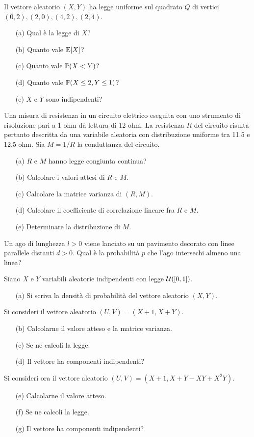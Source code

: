 \Esercizio{}
Il vettore aleatorio $(X,Y)$ ha legge uniforme sul quadrato $Q$ di vertici $(0,2),(2,0),(4,2),(2,4)$.
\begin{enumerate}
\item [(a)] Qual è la legge di $X$?
\item [(b)] Quanto vale $\mathbb{E}[X]$?
\item [(c)] Quanto vale $\mathbb{P}(X<Y)$?
\item [(d)] Quanto vale $\mathbb{P}(X\leq 2,Y\leq 1)$?
\item [(e)] $X$ e $Y$ sono indipendenti?
\end{enumerate}

\Esercizio{}
Una misura di resistenza in un circuito elettrico eseguita con uno strumento di risoluzione pari a 1 ohm dà lettura di 12 ohm. La resistenza $R$ del circuito risulta pertanto descritta da una variabile aleatoria con distribuzione uniforme tra 11.5 e 12.5 ohm. Sia $M=1/R$ la conduttanza del circuito. 
\begin{enumerate}
\item [(a)] $R$ e $M$ hanno legge congiunta continua?
\item [(b)] Calcolare i valori attesi di $R$ e $M$.
\item [(c)] Calcolare la matrice varianza di $(R,M)$.
\item [(d)] Calcolare il coefficiente di correlazione lineare fra $R$ e $M$.
\item [(e)] Determinare la distribuzione di $M$.
\end{enumerate}

Un ago di lunghezza $l>0$ viene lanciato su un pavimento decorato con linee parallele distanti $d>0$. Qual è la probabilità $p$ che l'ago intersechi almeno una linea?

\Esercizio{}
Siano $X$ e $Y$ variabili aleatorie indipendenti con legge $\mathcal{U}([0,1])$.
\begin{enumerate}
\item [(a)] Si scriva la densità di probabilità del vettore aleatorio $(X,Y)$.
\end{enumerate}
Si consideri il vettore aleatorio $(U,V)=(X+1,X+Y)$.
\begin{enumerate}
\item [(b)] Calcolarne il valore atteso e la matrice varianza.
\item [(c)] Se ne calcoli la legge.
\item [(d)] Il vettore ha componenti indipendenti?
\end{enumerate}
Si consideri ora il vettore aleatorio $(U,V)=(X+1,X+Y-XY+X^2Y)$.
\begin{enumerate}
\item [(e)] Calcolarne il valore atteso.
\item [(f)] Se ne calcoli la legge.
\item [(g)] Il vettore ha componenti indipendenti?
\end{enumerate}

